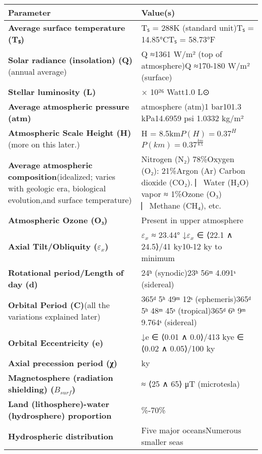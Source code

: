 \documentclass[
  letterpaper,
]{book}
\begin{document}
\begin{longtable}[]{@{}
  >{\raggedright\arraybackslash}p{}
  >{\raggedright\arraybackslash}p{}@{}}
\toprule\noalign{}
\begin{minipage}[b]{\linewidth}\raggedright
Parameter
\end{minipage} & \begin{minipage}[b]{\linewidth}\raggedright
Value(s)
\end{minipage} \\
\midrule\noalign{}
\endhead
\bottomrule\noalign{}
\endlastfoot
\textbf{Average surface temperature (Tₛ)} & Tₛ = 288K (standard unit)Tₛ
= 14.85°CTₛ = 58.73°F \\
\textbf{Solar radiance (insolation) (Q)}(annual average) & Q ≈1361 W/m²
(top of atmosphere)Q ≈170-180 W/m² (surface) \\
\textbf{Stellar luminosity (L)} & 3.828 × 10²⁶ Watt1.0 L⊙ \\
\textbf{Average atmospheric pressure (atm)} & 1 atmosphere (atm)1
bar101.3 kPa14.6959 psi 1.0332 kg/m² \\
\textbf{Atmospheric Scale Height (H)}(more on this later.) & H =
8.5km\(P(H) = 0.37^H\)\(P(km) = 0.37^{\frac{km}{8.5}}\) \\
\textbf{Average atmospheric composition}(idealized; varies with geologic
era, biological evolution,and surface temperature) & Nitrogen (N₂)
78\%Oxygen (O₂): 21\%Argon (Ar) \textbar{}Carbon dioxide (CO₂). ⎸Water
(H₂O) vapor \textbar{} ≈ 1\%Ozone (O₃) ⎸Methane (CH₄), etc.
\textbar{} \\
\textbf{Atmospheric Ozone (O₃)} & Present in upper atmosphere \\
\textbf{Axial Tilt/Obliquity (\(\varepsilon_x\))} & \(\varepsilon_x\) ≈
23.44° ↓\(\varepsilon_x\) ∈ ⟨22.1 ∧ 24.5⟩/41 ky10-12 ky to minimum \\
\textbf{Rotational period/Length of day (d)} & 24ʰ (synodic)23ʰ 56ᵐ
4.091ˢ (sidereal) \\
\textbf{Orbital Period (C)}(all the variations explained later) & 365ᵈ
5ʰ 49ᵐ 12ˢ (ephemeris)365ᵈ 5ʰ 48ᵐ 45ˢ (tropical)365ᵈ 6ʰ 9ᵐ 9.764ˢ
(sidereal) \\
\textbf{Orbital Eccentricity (e)} & 0.0167 ↓e ∈ ⟨0.01 ∧ 0.0⟩/413 kye ∈
⟨0.02 ∧ 0.05⟩/100 ky \\
\textbf{Axial precession period (χ)} & 25.772 ky \\
\textbf{Magnetosphere (radiation shielding) (\(B_{surf}\))} & ≈ ⟨25 ∧
65⟩ μT (microtesla) \\
\textbf{Land (lithosphere)-water (hydrosphere) proportion} &
30\%-70\% \\
\textbf{Hydrospheric distribution} & Five major oceansNumerous smaller
seas \\
\end{longtable}
\end{document}
